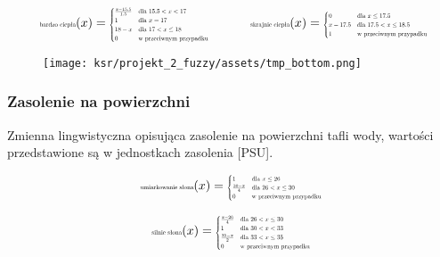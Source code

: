\documentclass{article}
\begin{document}
\begin{equation*}
\begin{minipage}{0.5\textwidth}
\centering
$\text{\scalebox{0.5}{bardzo ciepła}}(x) =
\scalebox{0.5}{$
\begin{cases}
\frac{x - 15.5}{1.5} & \text{dla } 15.5 < x < 17 \\
1 & \text{dla } x = 17 \\
18 - x & \text{dla } 17 < x \leq 18 \\
0 & \text{w przeciwnym przypadku}
\end{cases}
$}$
\end{minipage}%
\begin{minipage}{0.5\textwidth}
\centering
$\text{\scalebox{0.5}{skrajnie ciepła}}(x) =
\scalebox{0.5}{$
\begin{cases}
0 & \text{dla } x \leq 17.5 \\
x - 17.5 & \text{dla } 17.5 < x \leq 18.5 \\
1 & \text{w przeciwnym przypadku}
\end{cases}
$}$
\end{minipage}
\end{equation*}



\begin{figure}[H]
\centering
\texttt{[image: ksr/projekt\_2\_fuzzy/assets/tmp\_bottom.png]}
\label{fig:epsilon_bat}
\end{figure}

\subsubsection{Zasolenie na powierzchni}

\noindent Zmienna lingwistyczna opisująca zasolenie na powierzchni tafli wody, wartości przedstawione są w jednostkach zasolenia [PSU].

\begin{equation*}
\text{\scalebox{0.5}{umiarkowanie słona}}(x) =
\scalebox{0.5}{$
\begin{cases}
1 & \text{dla } x \leq 26 \\
\frac{30 - x}{4} & \text{dla } 26 < x \leq 30 \\
0 & \text{w przeciwnym przypadku}
\end{cases}
$}
\end{equation*}

\begin{equation*}
\text{\scalebox{0.5}{silnie słona}}(x) =
\scalebox{0.5}{$
\begin{cases}
\frac{x - 26}{4} & \text{dla } 26 < x \leq 30 \\
1 & \text{dla } 30 < x < 33 \\
\frac{35 - x}{2} & \text{dla } 33 < x \leq 35 \\
0 & \text{w przeciwnym przypadku}
\end{cases}
$}
\end{equation*}
\end{document}
